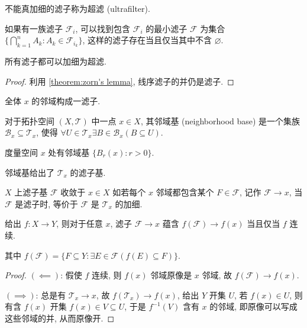 \begin{definition}[超滤]
    不能真加细的滤子称为超滤 (ultrafilter).
\end{definition}

\begin{lemma}
    如果有一族滤子 \(\mathcal{F}_i\), 可以找到包含 \(\mathcal{F}_i\) 的最小滤子 \(\mathcal{F}\)
    为集合 \(\{\bigcap_{k=1}^n A_k : A_k \in \mathcal{F}_{i_k}\}\), 这样的滤子存在当且仅当其中不含 \(\varnothing\).
\end{lemma}

\begin{lemma}
    所有滤子都可以加细为超滤.

    \begin{proof}
        利用 \ref{theorem:zorn's lemma}, 线序滤子的并仍是滤子.
    \end{proof}
\end{lemma}

\begin{example}
    全体 \(x\) 的邻域构成一滤子.
\end{example}

\begin{definition}[邻域基]
    对于拓扑空间 \((X,\mathcal{T})\) 中一点 \(x \in X\), 
    其邻域基 (neighborhood base) 是一个集族 \(\mathcal{B}_x \subseteq \mathcal{T}_x\), 
    使得 \(\forall U \in \mathcal{T}_x \exists B \in \mathcal{B}_x (B \subseteq U)\).
\end{definition}

\begin{example}
    度量空间 \(x\) 处有邻域基 \(\{B_r (x) : r > 0\}\).
\end{example}

\begin{corollary}
    邻域基给出了 \(\mathcal{T}_x\) 的滤子基.
\end{corollary}

\begin{definition}
    \(X\) 上滤子基 \(\mathcal{F}\) 收敛于 \(x \in X\) 如若每个 \(x\) 邻域都包含某个 \(F \in \mathcal{F}\),
    记作 \(\mathcal{F} \to x\), 当 \(\mathcal{F}\) 是滤子时, 等价于 \(\mathcal{F}\) 是 \(\mathcal{T}_x\) 的加细.
\end{definition}

\begin{lemma}
    给出 \(f : X \to Y\), 则对于任意 \(x\), 滤子 \(\mathcal{F} \to x\) 蕴含 \(f (\mathcal{F}) \to f(x)\) 当且仅当 \(f\) 连续.

    其中 \(f (\mathcal{F}) = \{F \subseteq Y : \exists E \in \mathcal{F} (f(E) \subseteq F)\}\).

    \begin{proof}
        \((\impliedby)\): 假使 \(f\) 连续, 则 \(f (x)\) 邻域原像是 \(x\) 邻域, 故 \(f (\mathcal{F}) \to f(x)\).

        \((\implies)\): 总是有 \(\mathcal{T}_x \to x\), 故 \(f (\mathcal{T}_x) \to f(x)\), 给出 \(Y\) 开集 \(U\),
        若 \(f (x) \in U\), 则有含 \(f(x)\) 开集 \(f(x) \in V \subseteq U\), 于是 \(f^{-1} (V)\) 含有 \(x\) 的邻域, 
        即原像可以写成这些邻域的并, 从而原像开.
    \end{proof}
\end{lemma}


